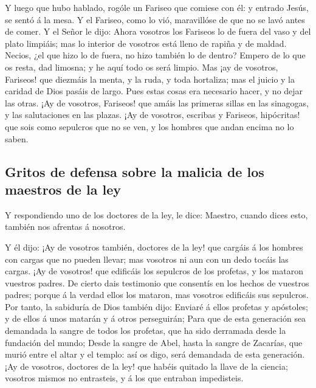  Y luego que hubo hablado, rogóle un Fariseo que comiese
con él: y entrado Jesús, se sentó á la mesa.  Y el
Fariseo, como lo vió, maravillóse de que no se lavó antes de comer.
 Y el Señor le dijo: Ahora vosotros los Fariseos lo de
fuera del vaso y del plato limpiáis; mas lo interior de vosotros está
lleno de rapiña y de maldad.  Necios, ¿el que hizo lo de
fuera, no hizo también lo de dentro?  Empero de lo que os
resta, dad limosna; y he aquí todo os será limpio.  Mas
¡ay de vosotros, Fariseos! que diezmáis la menta, y la ruda, y toda
hortaliza; mas el juicio y la caridad de Dios pasáis de largo. Pues
estas cosas era necesario hacer, y no dejar las otras. 
¡Ay de vosotros, Fariseos! que amáis las primeras sillas en las
sinagogas, y las salutaciones en las plazas.  ¡Ay de
vosotros, escribas y Fariseos, hipócritas! que sois como sepulcros que
no se ven, y los hombres que andan encima no lo saben.

\hypertarget{gritos-de-defensa-sobre-la-malicia-de-los-maestros-de-la-ley}{%
\subsection{Gritos de defensa sobre la malicia de los maestros de la
ley}\label{gritos-de-defensa-sobre-la-malicia-de-los-maestros-de-la-ley}}

 Y respondiendo uno de los doctores de la ley, le dice:
Maestro, cuando dices esto, también nos afrentas á nosotros.

 Y él dijo: ¡Ay de vosotros también, doctores de la ley!
que cargáis á los hombres con cargas que no pueden llevar; mas vosotros
ni aun con un dedo tocáis las cargas.  ¡Ay de vosotros!
que edificáis los sepulcros de los profetas, y los mataron vuestros
padres.  De cierto dais testimonio que consentís en los
hechos de vuestros padres; porque á la verdad ellos los mataron, mas
vosotros edificáis sus sepulcros.  Por tanto, la
sabiduría de Dios también dijo: Enviaré á ellos profetas y apóstoles; y
de ellos á unos matarán y á otros perseguirán;  Para que
de esta generación sea demandada la sangre de todos los profetas, que ha
sido derramada desde la fundación del mundo;  Desde la
sangre de Abel, hasta la sangre de Zacarías, que murió entre el altar y
el templo: así os digo, será demandada de esta generación.
 ¡Ay de vosotros, doctores de la ley! que habéis quitado
la llave de la ciencia; vosotros mismos no entrasteis, y á los que
entraban impedisteis.

